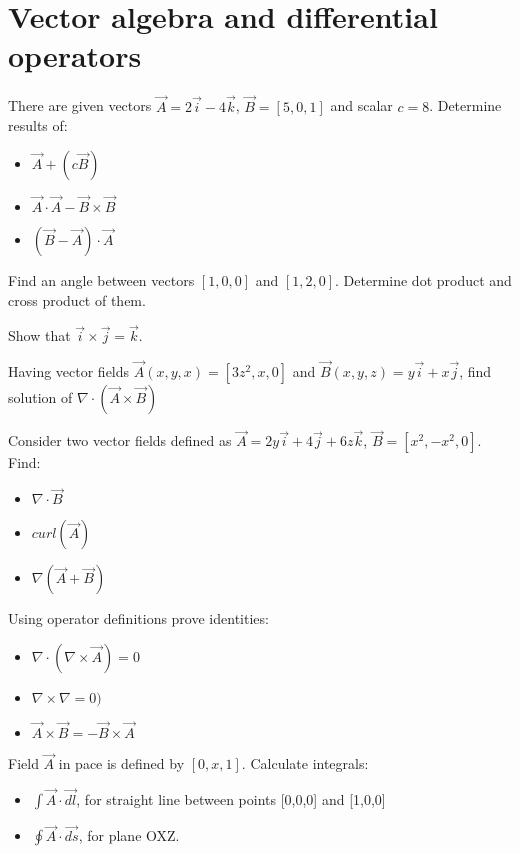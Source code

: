 \section{Vector algebra and differential operators}

\begin{Exercise}[difficulty=1]
There are given vectors $\vec A = 2 \vec{i} - 4\vec{k}$, $\vec B = [5, 0, 1]$ and scalar $c = 8$. Determine results of:

\begin{itemize}
\item $\vec A + (c \vec B)$
\item $\vec A \cdot \vec A - \vec B \times \vec B$
\item $(\vec B - \vec A) \cdot \vec A$
\end{itemize}

\end{Exercise}


\begin{Exercise}[difficulty=1]
Find an angle between vectors $[1,0,0]$ and $[1,2,0]$. Determine dot product and cross product of them.
\end{Exercise}


\begin{Exercise}[difficulty=1]
Show that $\vec{i}\times\vec{j} = \vec{k}$.
\end{Exercise}


\begin{Exercise}[difficulty=2]
Having vector fields $\vec A (x,y,x) = [3z^2, x, 0]$ and $\vec B (x,y,z) = y\vec{i} + x\vec{j}$, find solution of $\nabla \cdot (\vec A \times \vec{B})$
\end{Exercise}

\begin{Exercise}[difficulty=2]
Consider two vector fields defined as $\vec{A} = 2y\vec{i}+4\vec{j}+6z\vec{k}$, $\vec{B} = [ x^2, -x^2, 0]$. Find:
\begin{itemize}
\item $ \nabla \cdot \vec{B} $
\item $ {curl}( \vec A )$
\item $ \nabla ( \vec A + \vec B )$
\end{itemize}
\end{Exercise}

\begin{Exercise}[difficulty=2]
Using operator definitions prove identities:
\begin{itemize}
\item $ \nabla \cdot (\nabla \times \vec{A}) = 0$
\item $ \nabla \times \nabla = 0 )$
\item $ \vec{A} \times \vec{B} = - \vec{B} \times \vec{A} $
\end{itemize}
\end{Exercise}

\begin{Exercise}[difficulty=3]
Field $\vec A$ in pace is defined by $[0, x, 1]$. Calculate integrals:
\begin{itemize}
\item $\int \vec A \cdot \vec{dl}$, for straight line between points [0,0,0] and [1,0,0] 
\item $\oint \vec A \cdot \vec{ds}$, for plane OXZ.
\end{itemize}
\end{Exercise}

